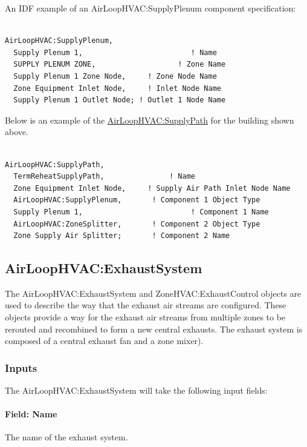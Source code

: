 An IDF example of an AirLoopHVAC:SupplyPlenum component specification:

\begin{lstlisting}

AirLoopHVAC:SupplyPlenum,
  Supply Plenum 1,                         ! Name
  SUPPLY PLENUM ZONE,                   ! Zone Name
  Supply Plenum 1 Zone Node,     ! Zone Node Name
  Zone Equipment Inlet Node,     ! Inlet Node Name
  Supply Plenum 1 Outlet Node; ! Outlet 1 Node Name
\end{lstlisting}

Below is an example of the \hyperref[airloophvacsupplypath]{AirLoopHVAC:SupplyPath} for the building shown above.

\begin{lstlisting}

AirLoopHVAC:SupplyPath,
  TermReheatSupplyPath,               ! Name
  Zone Equipment Inlet Node,     ! Supply Air Path Inlet Node Name
  AirLoopHVAC:SupplyPlenum,       ! Component 1 Object Type
  Supply Plenum 1,                         ! Component 1 Name
  AirLoopHVAC:ZoneSplitter,       ! Component 2 Object Type
  Zone Supply Air Splitter;       ! Component 2 Name
\end{lstlisting}

\subsection{AirLoopHVAC:ExhaustSystem}\label{airloophvacexhaustsystem}

The AirLoopHVAC:ExhaustSystem and ZoneHVAC:ExhaustControl objects are used to describe the way that the exhaust air streams are configured. These objects provide a way for the exhaust air streams from multiple zones to be rerouted and recombined to form a new central exhausts. The exhaust system is composed of a central exhaust fan and a zone mixer).

\subsubsection{Inputs}

The AirLoopHVAC:ExhaustSystem will take the following input fields:

\paragraph{Field: Name}

The name of the exhaust system.

